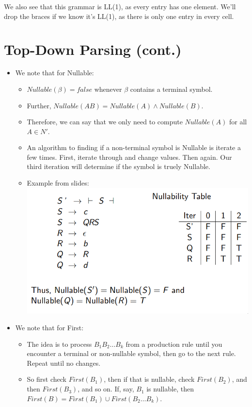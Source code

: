 \documentclass[12pt]{article}
\begin{document}
\noindent We also see that this grammar is LL(1), as every entry has one element.  We'll drop the braces if we know it's LL(1), as there is only one entry in every cell.

\section{Top-Down Parsing (cont.)}
\begin{itemize}
    \item We note that for Nullable:
        \begin{itemize}
            \item $Nullable(\beta) = false$ whenever $\beta$ contains a terminal symbol.
            \item Further, $Nullable(AB) = Nullable(A) \wedge Nullable(B)$.
            \item Therefore, we can say that we only need to compute $Nullable(A)$ for all $A \in N'$.
            \item An algorithm to finding if a non-terminal symbol is Nullable is iterate a few times.  First, iterate through and change values.  Then again.  Our third iteration will determine if the symbol is truely Nullable.
            \item Example from slides:\\
                \includegraphics[scale=0.5]{nullable_alg.png}
        \end{itemize}
    \item We note that for First:
        \begin{itemize}
            \item The idea is to process $B_1B_2\dots B_k$ from a production rule until you encounter a terminal or non-nullable symbol, then go to the next rule.  Repeat until no changes.
            \item So first check $First(B_1)$, then if that is nullable, check $First(B_2)$, and then $First(B_3)$, and so on.  If, say, $B_1$ is nullable, then $First(B) = First(B_1) \cup First(B_2\dots B_k)$.

\end{itemize}
\end{itemize}
\end{document}
